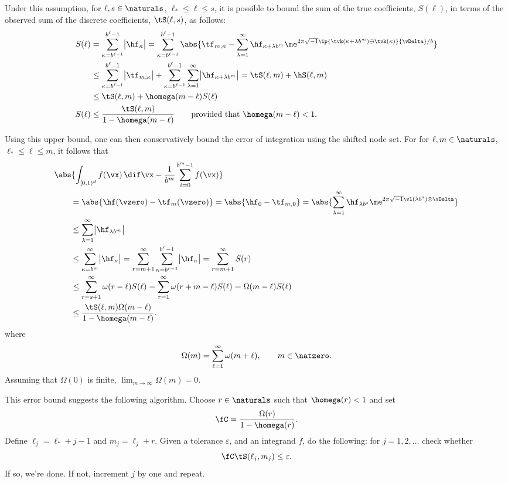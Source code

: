 \documentclass[]{elsarticle}
\newcommand{\fudge}{\fC}
\theoremstyle{definition}
\newcommand{\cube}{[0,1)^d}
\begin{document}
Under this assumption, for $\ell, s \in \naturals$, $\ell_* \le \ell \le s$, it is possible to bound the sum of the true coefficients, $S(\ell)$, in terms of the observed sum of the discrete coefficients, $\tS(\ell,s)$, as follows:
\begin{align*}
S(\ell) &= \sum_{\kappa=b^{\ell-1}}^{b^{\ell}-1} \bigl \lvert \hf_{\kappa}\bigr\rvert= \sum_{\kappa=b^{\ell-1}}^{b^{\ell}-1} \abs{\tf_{m,\kappa} - \sum_{\lambda=1}^{\infty} \hf_{\kappa+\lambda b^{m}} \me^{2 \pi \sqrt{-1} \ip{\tvk(\kappa+\lambda b^{m}) \ominus \tvk(\kappa)}{\vDelta}/b}}\\
&\le \sum_{\kappa=b^{\ell-1}}^{b^{\ell}-1} \bigl \lvert \tf_{m,\kappa} \bigr\rvert + \sum_{\kappa=b^{\ell-1}}^{b^{\ell}-1} \sum_{\lambda=1}^{\infty} \bigl \lvert \hf_{\kappa+\lambda b^{m}}\bigr\rvert = \tS(\ell,m) + \hS(\ell,m) \\
&\le \tS(\ell,m) + \homega(m-\ell) S(\ell) \\
S(\ell) & \le \frac{\tS(\ell,m)}{1 - \homega(m-\ell)} \qquad \text{provided that } \homega(m-\ell) < 1.
\end{align*}

Using this upper bound, one can then conservatively bound the error of integration using the shifted node set.  For for $\ell, m \in \naturals$, $\ell_* \le \ell \le m$, it follows that 
\begin{align*}
\MoveEqLeft{\abs{\int_{\cube} f(\vx) \, \dif \vx - \frac{1}{b^m} \sum_{i=0}^{b^m-1} f(\vx) }}\\
&= \abs{\hf(\vzero) - \tf_m(\vzero)} = \abs{\hf_0 - \tf_{m,0}} = \abs{\sum_{\lambda=1}^{\infty} \hf_{\lambda b^{s}} \me^{2 \pi \sqrt{-1} \vl(\lambda b^{s}) \otimes \vDelta}}\\
&\le \sum_{\lambda=1}^{\infty} \bigl \lvert \hf_{\lambda b^{m}} \bigr \rvert \\
&\le \sum_{\kappa=b^{m}}^{\infty} \bigl \lvert \hf_{\kappa} \bigr \rvert = \sum_{r=m+1}^{\infty} \sum_{\kappa=b^{r-1}}^{b^{r}-1} \bigl \lvert \hf_{\kappa} \bigr \rvert = \sum_{r=m+1}^{\infty} S(r)\\
&\le \sum_{r=s+1}^{\infty} \omega(r-\ell) S(\ell) =   \sum_{r=1}^{\infty} \omega(r+m-\ell) S(\ell) =  \Omega(m-\ell) S(\ell)\\
& \le \frac{\tS(\ell,m)\Omega(m-\ell)}{1 - \homega(m-\ell)}.
\end{align*}
where 
\[
\Omega(m)=\sum_{\ell=1}^{\infty} \omega(m+ \ell), \qquad m \in \natzero.
\]
Assuming that $\Omega(0)$ is finite, $\lim_{m \to \infty} \Omega(m) = 0$.

This error bound suggests the following algorithm.  Choose $r \in \naturals$ such that $\homega(r)<1$ and set 
\[
\fudge = \frac{\Omega(r)}{1 - \homega(r)}.
\]
Define $\ell_j=\ell_*+j-1$ and $m_j=\ell_j+r$.  Given a tolerance $\varepsilon$, and an integrand $f$, do the following:  for $j=1, 2, \ldots$ check whether
\[
\fudge \tS(\ell_j,m_j) \le \varepsilon.
\]
If so, we're done.  If not, increment $j$ by one and repeat.




\end{document}
